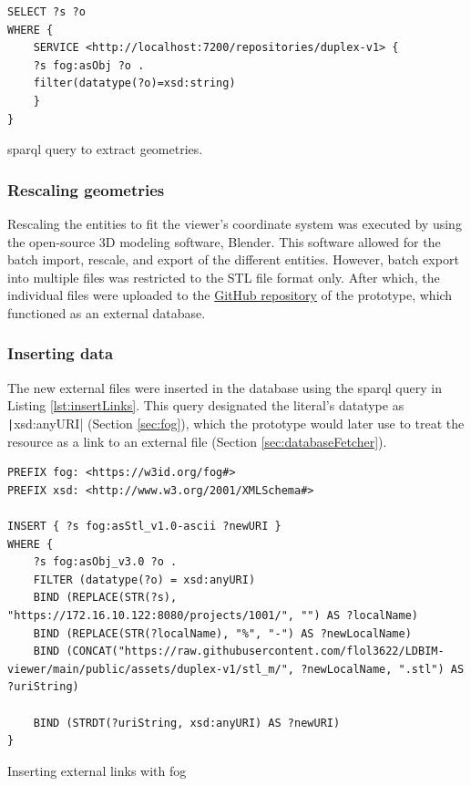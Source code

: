 \begin{listing}[H]
    \begin{verbatim}
SELECT ?s ?o
WHERE {
    SERVICE <http://localhost:7200/repositories/duplex-v1> {
    ?s fog:asObj ?o .
    filter(datatype(?o)=xsd:string)
    }
}
    \end{verbatim}
    \caption{\acs{sparql} query to extract geometries.}
    \label{lst:extractGeometries}
\end{listing}


\subsubsection{Rescaling geometries}
Rescaling the entities to fit the viewer's coordinate system was executed by using the open-source 3D modeling software, Blender. This software allowed for the batch import, rescale, and export of the different entities. However, batch export into multiple files was restricted to the STL file format only. After which, the individual files were uploaded to the \href{https://github.com/flol3622/LDBIM-viewer}{GitHub repository} of the prototype, which functioned as an external database.

\subsubsection{Inserting data}

The new external files were inserted in the database using the \ac{sparql} query in Listing \ref{lst:insertLinks}. This query designated the literal's datatype as \texttt|xsd:anyURI| (Section \ref{sec:fog}), which the prototype would later use to treat the resource as a link to an external file (Section \ref{sec:databaseFetcher}).

\begin{listing}[H]
    \begin{verbatim}
PREFIX fog: <https://w3id.org/fog#>
PREFIX xsd: <http://www.w3.org/2001/XMLSchema#>

INSERT { ?s fog:asStl_v1.0-ascii ?newURI }
WHERE { 
    ?s fog:asObj_v3.0 ?o .
    FILTER (datatype(?o) = xsd:anyURI)
    BIND (REPLACE(STR(?s), "https://172.16.10.122:8080/projects/1001/", "") AS ?localName)
    BIND (REPLACE(STR(?localName), "%", "-") AS ?newLocalName)
    BIND (CONCAT("https://raw.githubusercontent.com/flol3622/LDBIM-viewer/main/public/assets/duplex-v1/stl_m/", ?newLocalName, ".stl") AS ?uriString)
    
    BIND (STRDT(?uriString, xsd:anyURI) AS ?newURI)
}
    \end{verbatim}
    \caption{Inserting external links with \acs{fog}}
    \label{lst:insertLinks}
\end{listing}

